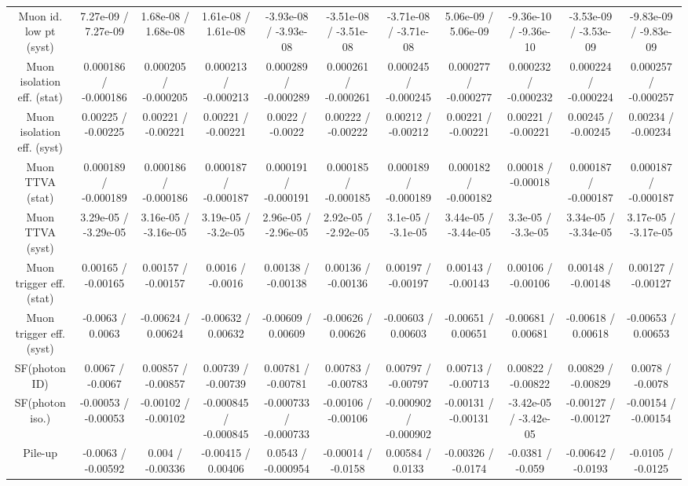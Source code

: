 \begin{table}[htbp]
\begin{center}
\begin{tabular}{|c|c|c|c|c|c|c|c|c|c|c|}
  Muon id. low pt (syst) & 7.27e-09 / 7.27e-09 & 1.68e-08 / 1.68e-08 & 1.61e-08 / 1.61e-08 & -3.93e-08 / -3.93e-08 & -3.51e-08 / -3.51e-08 & -3.71e-08 / -3.71e-08 & 5.06e-09 / 5.06e-09 & -9.36e-10 / -9.36e-10 & -3.53e-09 / -3.53e-09 & -9.83e-09 / -9.83e-09 \\ 
  Muon isolation eff. (stat) & 0.000186 / -0.000186 & 0.000205 / -0.000205 & 0.000213 / -0.000213 & 0.000289 / -0.000289 & 0.000261 / -0.000261 & 0.000245 / -0.000245 & 0.000277 / -0.000277 & 0.000232 / -0.000232 & 0.000224 / -0.000224 & 0.000257 / -0.000257 \\ 
  Muon isolation eff. (syst) & 0.00225 / -0.00225 & 0.00221 / -0.00221 & 0.00221 / -0.00221 & 0.0022 / -0.0022 & 0.00222 / -0.00222 & 0.00212 / -0.00212 & 0.00221 / -0.00221 & 0.00221 / -0.00221 & 0.00245 / -0.00245 & 0.00234 / -0.00234 \\ 
  Muon TTVA (stat) & 0.000189 / -0.000189 & 0.000186 / -0.000186 & 0.000187 / -0.000187 & 0.000191 / -0.000191 & 0.000185 / -0.000185 & 0.000189 / -0.000189 & 0.000182 / -0.000182 & 0.00018 / -0.00018 & 0.000187 / -0.000187 & 0.000187 / -0.000187 \\ 
  Muon TTVA (syst) & 3.29e-05 / -3.29e-05 & 3.16e-05 / -3.16e-05 & 3.19e-05 / -3.2e-05 & 2.96e-05 / -2.96e-05 & 2.92e-05 / -2.92e-05 & 3.1e-05 / -3.1e-05 & 3.44e-05 / -3.44e-05 & 3.3e-05 / -3.3e-05 & 3.34e-05 / -3.34e-05 & 3.17e-05 / -3.17e-05 \\ 
  Muon trigger eff. (stat) & 0.00165 / -0.00165 & 0.00157 / -0.00157 & 0.0016 / -0.0016 & 0.00138 / -0.00138 & 0.00136 / -0.00136 & 0.00197 / -0.00197 & 0.00143 / -0.00143 & 0.00106 / -0.00106 & 0.00148 / -0.00148 & 0.00127 / -0.00127 \\ 
  Muon trigger eff. (syst) & -0.0063 / 0.0063 & -0.00624 / 0.00624 & -0.00632 / 0.00632 & -0.00609 / 0.00609 & -0.00626 / 0.00626 & -0.00603 / 0.00603 & -0.00651 / 0.00651 & -0.00681 / 0.00681 & -0.00618 / 0.00618 & -0.00653 / 0.00653 \\ 
  SF(photon ID) & 0.0067 / -0.0067 & 0.00857 / -0.00857 & 0.00739 / -0.00739 & 0.00781 / -0.00781 & 0.00783 / -0.00783 & 0.00797 / -0.00797 & 0.00713 / -0.00713 & 0.00822 / -0.00822 & 0.00829 / -0.00829 & 0.0078 / -0.0078 \\ 
  SF(photon iso.) & -0.00053 / -0.00053 & -0.00102 / -0.00102 & -0.000845 / -0.000845 & -0.000733 / -0.000733 & -0.00106 / -0.00106 & -0.000902 / -0.000902 & -0.00131 / -0.00131 & -3.42e-05 / -3.42e-05 & -0.00127 / -0.00127 & -0.00154 / -0.00154 \\ 
  Pile-up & -0.0063 / -0.00592 & 0.004 / -0.00336 & -0.00415 / 0.00406 & 0.0543 / -0.000954 & -0.00014 / -0.0158 & 0.00584 / 0.0133 & -0.00326 / -0.0174 & -0.0381 / -0.059 & -0.00642 / -0.0193 & -0.0105 / -0.0125 \\ 

\end{tabular}
\end{center}
\end{table}

